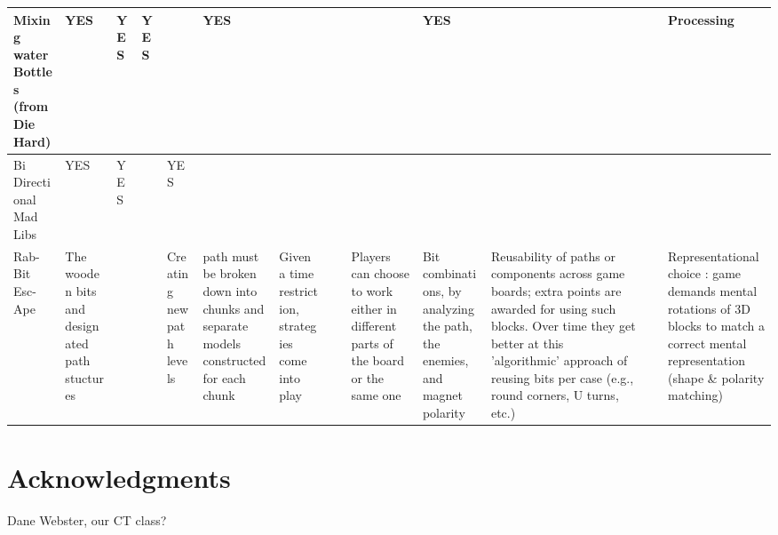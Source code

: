 \documentclass{acm_proc_article-sp}
\begin{document}
\begin{sidewaystable}[htbp]
\begin{tabular}{|p{1.3cm}||p{1cm}|p{2cm}|p{2cm}|p{1.6cm}|p{2cm}|p{1cm}|p{2cm}|p{1cm}|p{1.3cm}|p{2.7cm}|p{1cm}|p{1.6cm}|}
    Mixing water Bottles (from Die Hard\cite{diehard2008thorp}) & \cellcolor{blue!25}YES & \cellcolor{blue!25}YES & \cellcolor{blue!25}YES & ~ & \cellcolor{blue!25}YES & ~ & ~ & ~ & \cellcolor{blue!25}YES & ~ & ~ & Processing \\ \hline
    
    Bi Directional Mad Libs & \cellcolor{blue!25}YES & \cellcolor{blue!25}YES & ~ & \cellcolor{blue!25}YES & ~ & ~ & ~ & ~ & ~ & ~ & ~ & ~ \\ \hline
    
    Rab-Bit Esc-Ape & The wooden bits and designated path stuctures & ~ & ~ & Creating new path levels & path must be broken down into chunks and separate models constructed for each chunk & Given a time restriction, strategies come into play & ~ & Players can choose to work either in different parts of the board or the same one & Bit combinations, by analyzing the path, the enemies, and magnet polarity & Reusability of paths or components across game boards; extra points are awarded for using such blocks. Over time they get better at this 'algorithmic' approach of reusing bits per case (e.g., round corners, U turns, etc.) & ~ & Representational choice : game demands mental rotations of 3D blocks to match a correct mental representation (shape \& polarity matching) \\ \hline
    \end{tabular}\hspace*{-1cm}\vspace*{-1cm}
\end{sidewaystable}

\clearpage
\section{Acknowledgments}
Dane Webster, our CT class?
\end{document}
